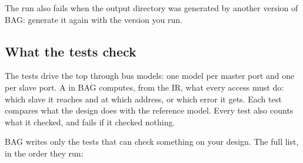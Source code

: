 The run also fails when the output directory was generated by another version of BAG:
generate it again with the version you run.



\subsection{What the tests check}

The tests drive the top through bus models: one model per master port and one per slave
port. A  in BAG computes, from the IR, what every access must do:
which slave it reaches and at which address, or which error it gets. Each test compares
what the design does with the reference model. Every test also counts what it checked,
and fails if it checked nothing.

BAG writes only the tests that can check something on your design. The full list, in the
order they run:

